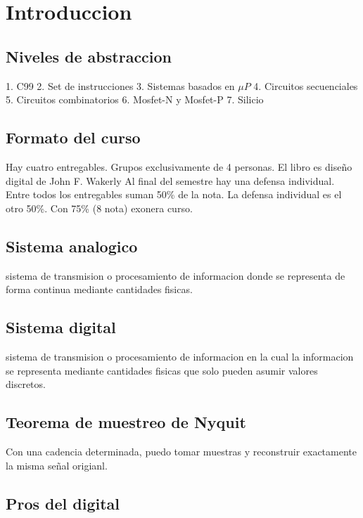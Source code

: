 \documentclass{report}
\begin{document}
\tableofcontents

\chapter{Introduccion}
\section{Niveles de abstraccion}

1. C99
2. Set de instrucciones
3. Sistemas basados en $\mu P$
4. Circuitos secuenciales
5. Circuitos combinatorios
6. Mosfet-N y Mosfet-P
7. Silicio

\section{Formato del curso}

Hay cuatro entregables. Grupos exclusivamente de 4 personas.
El libro es diseño digital de John F. Wakerly
Al final del semestre hay una defensa individual.
Entre todos los entregables suman 50\% de la nota. La defensa individual es el otro 50\%. Con 75\% (8 nota) exonera curso.


\section{Sistema analogico}

sistema de transmision o procesamiento de informacion donde se representa de forma continua mediante cantidades fisicas.

\section{Sistema digital}

sistema de transmision o procesamiento de informacion en la cual la informacion se representa mediante cantidades fisicas que solo pueden asumir valores discretos.

\section{Teorema  de muestreo de Nyquit}

Con una cadencia determinada, puedo tomar muestras y reconstruir exactamente la misma señal origianl.

\section{Pros del digital}
\end{document}
